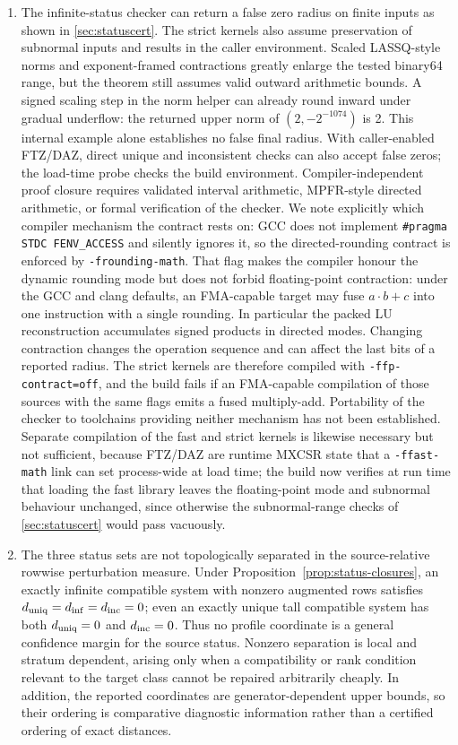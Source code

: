 \documentclass[11pt]{article}
\theoremstyle{definition}
\begin{document}
\begin{enumerate}
\item The infinite-status checker can return a false zero radius on finite inputs as shown in \cref{sec:statuscert}. The strict kernels also assume preservation of subnormal inputs and results in the caller environment. Scaled LASSQ-style norms and exponent-framed contractions greatly enlarge the tested binary64 range, but the theorem still assumes valid outward arithmetic bounds. A signed scaling step in the norm helper can already round inward under gradual underflow: the returned upper norm of $(2,-2^{-1074})$ is 2. This internal example alone establishes no false final radius. With caller-enabled FTZ/DAZ, direct unique and inconsistent checks can also accept false zeros; the load-time probe checks the build environment. Compiler-independent proof closure requires validated interval arithmetic, MPFR-style directed arithmetic, or formal verification of the checker. We note explicitly which compiler mechanism the contract rests on: GCC does not implement \texttt{\#pragma STDC FENV\_ACCESS} and silently ignores it, so the directed-rounding contract is enforced by \texttt{-frounding-math}. That flag makes the compiler honour the dynamic rounding mode but does not forbid floating-point contraction: under the GCC and clang defaults, an FMA-capable target may fuse $a\cdot b+c$ into one instruction with a single rounding. In particular the packed LU reconstruction accumulates signed products in directed modes. Changing contraction changes the operation sequence and can affect the last bits of a reported radius. The strict kernels are therefore compiled with \texttt{-ffp-contract=off}, and the build fails if an FMA-capable compilation of those sources with the same flags emits a fused multiply-add. Portability of the checker to toolchains providing neither mechanism has not been established. Separate compilation of the fast and strict kernels is likewise necessary but not sufficient, because FTZ/DAZ are runtime MXCSR state that a \texttt{-ffast-math} link can set process-wide at load time; the build now verifies at run time that loading the fast library leaves the floating-point mode and subnormal behaviour unchanged, since otherwise the subnormal-range checks of \cref{sec:statuscert} would pass vacuously.
\item The three status sets are not topologically separated in the source-relative rowwise perturbation measure. Under Proposition~\ref{prop:status-closures}, an exactly infinite compatible system with nonzero augmented rows satisfies $d_{\rm uniq}=d_{\rm inf}=d_{\rm inc}=0$; even an exactly unique tall compatible system has both $d_{\rm uniq}=0$ and $d_{\rm inc}=0$. Thus no profile coordinate is a general confidence margin for the source status. Nonzero separation is local and stratum dependent, arising only when a compatibility or rank condition relevant to the target class cannot be repaired arbitrarily cheaply. In addition, the reported coordinates are generator-dependent upper bounds, so their ordering is comparative diagnostic information rather than a certified ordering of exact distances.

\end{enumerate}
\end{document}
